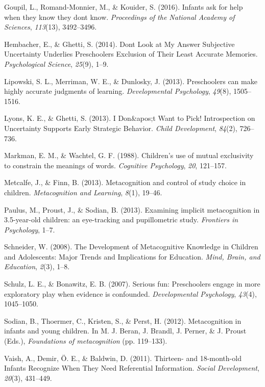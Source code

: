 \documentclass[10pt, letterpaper]{article}
\begin{document}
\hypertarget{ref-Goupil2016}{}
Goupil, L., Romand-Monnier, M., \& Kouider, S. (2016). Infants ask for
help when they know they dont know. \emph{Proceedings of the National
Academy of Sciences}, \emph{113}(13), 3492--3496.

\hypertarget{ref-Hembacher2014}{}
Hembacher, E., \& Ghetti, S. (2014). Dont Look at My Answer Subjective
Uncertainty Underlies Preschoolers Exclusion of Their Least Accurate
Memories. \emph{Psychological Science}, \emph{25}(9), 1--9.

\hypertarget{ref-Lipowski2013}{}
Lipowski, S. L., Merriman, W. E., \& Dunlosky, J. (2013). Preschoolers
can make highly accurate judgments of learning. \emph{Developmental
Psychology}, \emph{49}(8), 1505--1516.

\hypertarget{ref-Lyons2013}{}
Lyons, K. E., \& Ghetti, S. (2013). I Don\&apos;t Want to Pick!
Introspection on Uncertainty Supports Early Strategic Behavior.
\emph{Child Development}, \emph{84}(2), 726--736.

\hypertarget{ref-Markman1988}{}
Markman, E. M., \& Wachtel, G. F. (1988). Children's use of mutual
exclusivity to constrain the meanings of words. \emph{Cognitive
Psychology}, \emph{20}, 121--157.

\hypertarget{ref-Metcalfe2013}{}
Metcalfe, J., \& Finn, B. (2013). Metacognition and control of study
choice in children. \emph{Metacognition and Learning}, \emph{8}(1),
19--46.

\hypertarget{ref-Paulus2013}{}
Paulus, M., Proust, J., \& Sodian, B. (2013). Examining implicit
metacognition in 3.5-year-old children: an eye-tracking and
pupillometric study. \emph{Frontiers in Psychology}, 1--7.

\hypertarget{ref-Schneider2008}{}
Schneider, W. (2008). The Development of Metacognitive Knowledge in
Children and Adolescents: Major Trends and Implications for Education.
\emph{Mind, Brain, and Education}, \emph{2}(3), 1--8.

\hypertarget{ref-Schulz2007}{}
Schulz, L. E., \& Bonawitz, E. B. (2007). Serious fun: Preschoolers
engage in more exploratory play when evidence is confounded.
\emph{Developmental Psychology}, \emph{43}(4), 1045--1050.

\hypertarget{ref-Sodian2012}{}
Sodian, B., Thoermer, C., Kristen, S., \& Perst, H. (2012).
Metacognition in infants and young children. In M. J. Beran, J. Brandl,
J. Perner, \& J. Proust (Eds.), \emph{Foundations of metacognition} (pp.
119--133).

\hypertarget{ref-Vaish2011}{}
Vaish, A., Demir, Ö. E., \& Baldwin, D. (2011). Thirteen- and
18-month-old Infants Recognize When They Need Referential Information.
\emph{Social Development}, \emph{20}(3), 431--449.
\end{document}

